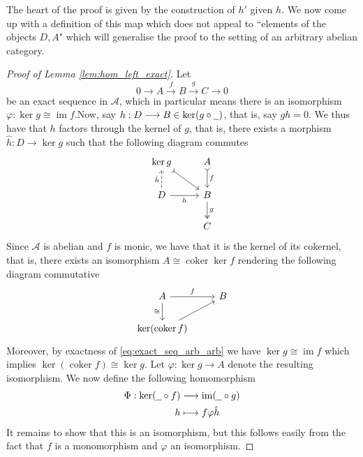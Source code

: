\documentclass[12pt]{article}
\theoremstyle{plain}
\theoremstyle{definition}
\newcommand{\scr}[1]{\mathscr{#1}}
\newcommand{\und}[1]{\underline{\hspace{#1 cm}}}
\newcommand{\lto}{\longrightarrow}
\begin{document}
The heart of the proof is given by the construction of $h'$ given $h$. We now come up with a definition of this map which does not appeal to ``elements of the objects $D,A$" which will generalise the proof to the setting of an arbitrary abelian category.
\begin{proof}[Proof of Lemma \ref{lem:hom_left_exact}]
Let
\begin{equation}\label{eq:exact_seq_arb_arb}
0 \lto A\stackrel{f}{\lto} B \stackrel{g}{\lto}C \lto 0
\end{equation}
be an exact sequence in $\scr{A}$, which in particular means there is an isomorphism $\varphi: \operatorname{ker}g \cong \operatorname{im}f$.Now, say $h: D \lto B \in \operatorname{ker}(g \circ \und{0.2})$, that is, say $gh = 0$.  We thus have that $h$ factors through the kernel of $g$, that is, there exists a morphism $\hat{h}: D \lto \operatorname{ker}g$ such that the following diagram commutes
\begin{equation}
\begin{tikzcd}
\operatorname{ker}g\arrow[dr,rightarrowtail] & A\arrow[d,rightarrowtail,"f"]\\
D\arrow[r,swap,"h"]\arrow[u,dashed,"{\hat{h}}"] & B\arrow[d,twoheadrightarrow,"g"]\\
& C
\end{tikzcd}
\end{equation}
Since $\scr{A}$ is abelian and $f$ is monic, we have that it is the kernel of its cokernel, that is, there exists an isomorphism $A \cong \operatorname{coker}\operatorname{ker}f$ rendering the following diagram commutative
\begin{equation}
\begin{tikzcd}
A\arrow[r,"f"]\arrow[d,swap,"{\cong}"] & B\\
\operatorname{ker}(\operatorname{coker}f)\arrow[ur]
\end{tikzcd}
\end{equation}
Moreover, by exactness of \ref{eq:exact_seq_arb_arb} we have $\operatorname{ker}g \cong \operatorname{im}f$ which implies $\operatorname{ker}(\operatorname{coker}f) \cong \operatorname{ker}g$. Let $\varphi: \operatorname{ker}g \lto A$ denote the resulting isomorphism. We now define the following homomorphism
\begin{align*}
\Phi: \operatorname{ker}(\und{0.2} \circ f) &\lto \operatorname{im}(\und{0.2} \circ g)\\
h &\longmapsto f \varphi \hat{h}
\end{align*}
It remains to show that this is an isomorphism, but this follows easily from the fact that $f$ is a monomorphism and $\varphi$ an isomorphism.
\end{proof}
\end{document}
